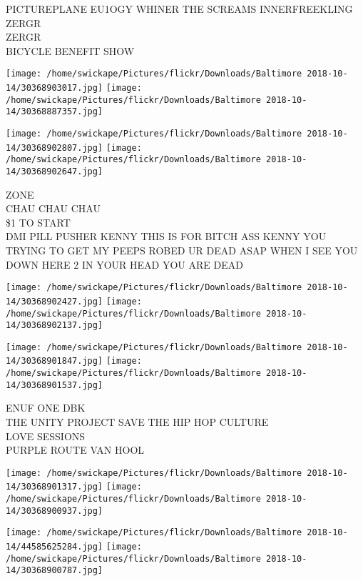 \documentclass[10pt,letterpaper]{article}
\begin{document}
PICTUREPLANE EU1OGY WHINER THE SCREAMS INNERFREEKLING\\
ZERGR\\
ZERGR\\
BICYCLE BENEFIT SHOW\\
\pagebreak

\texttt{[image: /home/swickape/Pictures/flickr/Downloads/Baltimore 2018-10-14/30368903017.jpg]}
\texttt{[image: /home/swickape/Pictures/flickr/Downloads/Baltimore 2018-10-14/30368887357.jpg]}

\texttt{[image: /home/swickape/Pictures/flickr/Downloads/Baltimore 2018-10-14/30368902807.jpg]}
\texttt{[image: /home/swickape/Pictures/flickr/Downloads/Baltimore 2018-10-14/30368902647.jpg]}

ZONE\\
CHAU CHAU CHAU\\
\$1 TO START\\
DMI PILL PUSHER KENNY THIS IS FOR BITCH ASS KENNY YOU TRYING TO GET MY PEEPS ROBED UR DEAD ASAP WHEN I SEE YOU DOWN HERE 2 IN YOUR HEAD YOU ARE DEAD\\
\pagebreak

\texttt{[image: /home/swickape/Pictures/flickr/Downloads/Baltimore 2018-10-14/30368902427.jpg]}
\texttt{[image: /home/swickape/Pictures/flickr/Downloads/Baltimore 2018-10-14/30368902137.jpg]}

\texttt{[image: /home/swickape/Pictures/flickr/Downloads/Baltimore 2018-10-14/30368901847.jpg]}
\texttt{[image: /home/swickape/Pictures/flickr/Downloads/Baltimore 2018-10-14/30368901537.jpg]}

ENUF ONE DBK\\
THE UNITY PROJECT SAVE THE HIP HOP CULTURE\\
LOVE SESSIONS\\
PURPLE ROUTE VAN HOOL\\
\pagebreak

\texttt{[image: /home/swickape/Pictures/flickr/Downloads/Baltimore 2018-10-14/30368901317.jpg]}
\texttt{[image: /home/swickape/Pictures/flickr/Downloads/Baltimore 2018-10-14/30368900937.jpg]}

\texttt{[image: /home/swickape/Pictures/flickr/Downloads/Baltimore 2018-10-14/44585625284.jpg]}
\texttt{[image: /home/swickape/Pictures/flickr/Downloads/Baltimore 2018-10-14/30368900787.jpg]}
\end{document}
